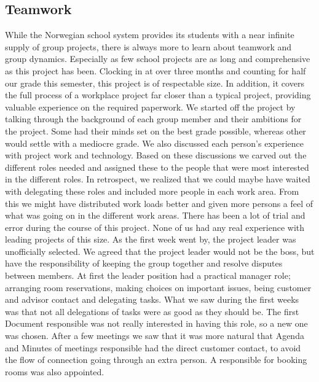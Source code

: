 \subsection{Teamwork}
While the Norwegian school system provides its students with a near infinite supply of group projects, there is always more to learn about teamwork and group dynamics. Especially as few school projects are as long and comprehensive as this project has been. Clocking in at over three months and counting for half our grade this semester, this project is of respectable size. In addition, it covers the full process of a workplace project far closer than a typical project, providing valuable experience on the required paperwork.
\newline
\newline
We started off the project by talking through the background of each group member and their ambitions for the project. Some had their minds set on the best grade possible, whereas other would settle with a mediocre grade. We also discussed each person's experience with project work and technology. Based on these discussions we carved out the different roles needed and assigned these to the people that were most interested in the different roles. In retrospect, we realized that we could maybe have waited with delegating these roles and included more people in each work area. From this we might have distributed work loads better and given more persons a feel of what was going on in the different work areas. 
\newline
\newline
There has been a lot of trial and error during the course of this project. None of us had any real experience with leading projects of this size. As the first week went by, the project leader was unofficially selected. We agreed that the project leader would not be the boss, but have the responsibility of keeping the group together and resolve disputes between members. At first the leader position had a practical manager role; arranging room reservations, making choices on important issues, being customer and advisor contact and delegating tasks. What we saw during the first weeks was that not all delegations of tasks were as good as they should be. The first Document responsible was not really interested in having this role, so a new one was chosen. After a few meetings we saw that it was more natural that Agenda and Minutes of meetings responsible had the direct customer contact, to avoid the flow of connection going through an extra person. A responsible for booking rooms was also appointed.
